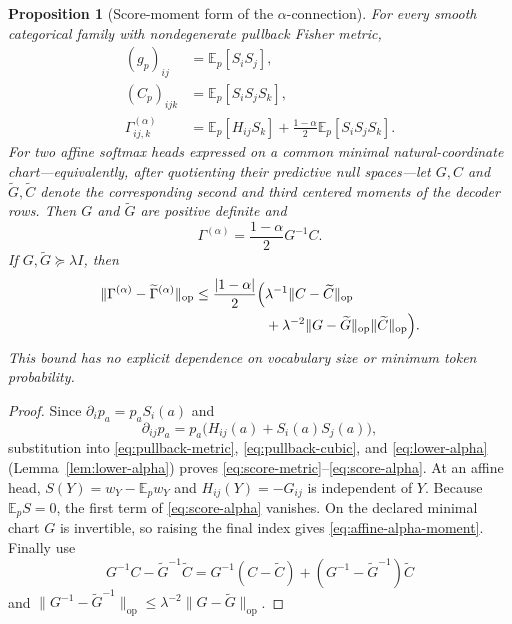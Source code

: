 \documentclass[11pt]{article}
\newtheorem{proposition}[theorem]{Proposition}
\theoremstyle{definition}
\theoremstyle{remark}
\newcommand{\E}{\mathbb{E}}
\newcommand{\op}{\mathrm{op}}
\begin{document}
\begin{proposition}[Score-moment form of the $\alpha$-connection]\label{prop:score-moments}
For every smooth categorical family with nondegenerate pullback Fisher metric,
\begin{align}
    (g_p)_{ij}&=\E_p[S_iS_j],\label{eq:score-metric}\\
    (C_p)_{ijk}&=\E_p[S_iS_jS_k],\label{eq:score-cubic}\\
    \Gamma^{(\alpha)}_{ij,k}
    &=\E_p[H_{ij}S_k]
      +\frac{1-\alpha}{2}\E_p[S_iS_jS_k].
      \label{eq:score-alpha}
\end{align}
For two affine softmax heads expressed on a common \emph{minimal}
natural-coordinate chart---equivalently, after quotienting their predictive
null spaces---let $G,C$ and $\widetilde G,\widetilde C$ denote the corresponding
second and third centered moments of the decoder rows. Then $G$ and
$\widetilde G$ are positive definite and
\begin{equation}
    \Gamma^{(\alpha)}=\frac{1-\alpha}{2}G^{-1}C.
    \label{eq:affine-alpha-moment}
\end{equation}
If $G,\widetilde G\succeq\lambda I$, then
\begin{equation}
\begin{split}
    \|\Gamma^{(\alpha)}-\widetilde\Gamma^{(\alpha)}\|_{\op}
    \le\frac{|1-\alpha|}{2}\Bigl(&\lambda^{-1}\|C-\widetilde C\|_{\op}\\
    &+\lambda^{-2}\|G-\widetilde G\|_{\op}
      \|\widetilde C\|_{\op}\Bigr).
\end{split}
\label{eq:affine-alpha-stability}
\end{equation}
This bound has no explicit dependence on vocabulary size or minimum token probability.
\end{proposition}

\begin{proof}
Since $\partial_i p_a=p_aS_i(a)$ and
\begin{equation}
    \partial_{ij}p_a=p_a\bigl(H_{ij}(a)+S_i(a)S_j(a)\bigr),
\end{equation}
substitution into \eqref{eq:pullback-metric}, \eqref{eq:pullback-cubic}, and
\eqref{eq:lower-alpha} (Lemma~\ref{lem:lower-alpha}) proves
\eqref{eq:score-metric}--\eqref{eq:score-alpha}. At an affine head,
$S(Y)=w_Y-\E_pw_Y$ and $H_{ij}(Y)=-G_{ij}$ is independent of $Y$.
Because $\E_pS=0$, the first term of \eqref{eq:score-alpha} vanishes. On the
declared minimal chart $G$ is invertible, so raising the final index gives
\eqref{eq:affine-alpha-moment}. Finally use
\begin{equation}
    G^{-1}C-\widetilde G^{-1}\widetilde C
    =G^{-1}(C-\widetilde C)
     +(G^{-1}-\widetilde G^{-1})\widetilde C
\end{equation}
and $\|G^{-1}-\widetilde G^{-1}\|_{\op}
\le\lambda^{-2}\|G-\widetilde G\|_{\op}$.
\end{proof}
\end{document}
